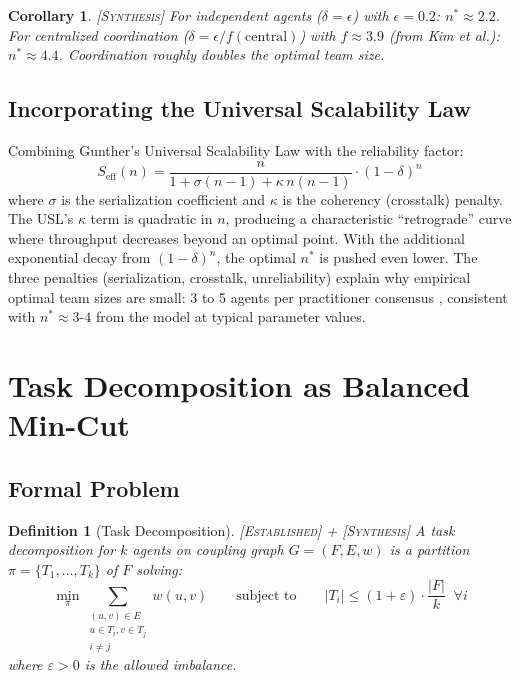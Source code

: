 \documentclass[11pt, a4paper, logo, copyright]{googledeepmind}
\newtheorem{definition}{Definition}[section]
\newtheorem{corollary}[theorem]{Corollary}
\newcommand{\established}{\textsc{[Established]}}
\newcommand{\synthesis}{\textsc{[Synthesis]}}
\begin{document}
\begin{corollary} \synthesis{}
For independent agents ($\delta = \epsilon$) with $\epsilon = 0.2$: $n^* \approx 2.2$.
For centralized coordination ($\delta = \epsilon / f(\mathrm{central})$) with $f \approx 3.9$ (from Kim et al.): $n^* \approx 4.4$.
Coordination roughly doubles the optimal team size.
\end{corollary}

\subsection{Incorporating the Universal Scalability Law}

Combining Gunther's Universal Scalability Law \citep{Gunther2008} with the reliability factor:
\begin{equation}
\label{eq:usl-extended}
  S_{\mathrm{eff}}(n) = \frac{n}{1 + \sigma(n-1) + \kappa \, n(n-1)} \cdot (1-\delta)^n
\end{equation}
where $\sigma$ is the serialization coefficient and $\kappa$ is the coherency (crosstalk) penalty.
The USL's $\kappa$ term is quadratic in $n$, producing a characteristic ``retrograde'' curve where throughput decreases beyond an optimal point.
With the additional exponential decay from $(1-\delta)^n$, the optimal $n^*$ is pushed even lower.
The three penalties (serialization, crosstalk, unreliability) explain why empirical optimal team sizes are small: 3 to 5 agents per practitioner consensus \citep{Osmani2025}, consistent with $n^* \approx 3$-$4$ from the model at typical parameter values.


\section{Task Decomposition as Balanced Min-Cut}
\label{sec:decomp}

\subsection{Formal Problem}

\begin{definition}[Task Decomposition] \established{} + \synthesis{}
\label{def:decomp}
A task decomposition for $k$ agents on coupling graph $G = (F, E, w)$ is a partition $\pi = \{T_1, \ldots, T_k\}$ of $F$ solving:
\begin{equation}
\label{eq:mincut}
  \min_\pi \sum_{\substack{(u,v) \in E \\ u \in T_i, v \in T_j \\ i \neq j}} w(u,v) \qquad \text{subject to} \qquad |T_i| \leq (1+\varepsilon) \cdot \frac{|F|}{k} \;\; \forall i
\end{equation}
where $\varepsilon > 0$ is the allowed imbalance.
\end{definition}
\end{document}
